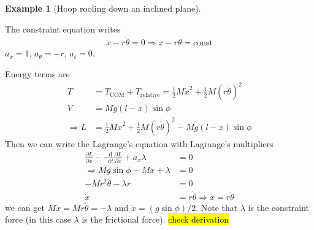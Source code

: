 \documentclass[twoside,11pt]{article}
\numberwithin{equation}{section} %
\newcommand{\lms}{\fontfamily{lmss}\selectfont} %
\renewcommand*\d{\mathop{}\!\mathrm{d}}
\theoremstyle{definition}
\newtheorem{example}{\lms Example}[section]
\theoremstyle{remark}
\begin{document}
\begin{example}[Hoop rooling down an inclined plane]\
\tikzexternalenable
\begin{figure}[H]
    \centering
\end{figure}
\tikzexternaldisable
The constraint equation writes
\begin{align*}
    \dot{x} - r\dot{\theta} = 0
    \Rightarrow x - r\theta = \text{const}
\end{align*}
$a_x=1$, $a_\theta = -r$, $a_t=0$.

Energy terms are
\begin{align*}
    T &= 
    T_\text{COM} + T_\text{relative}
    = \frac{1}{2}M\dot{x}^2 + \frac{1}{2}M(r\dot{\theta})^2\\
    V &= Mg(l-x)\sin\phi\\
    \Rightarrow
    L &=  \frac{1}{2}M\dot{x}^2 + \frac{1}{2}M(r\dot{\theta})^2
    - Mg(l-x)\sin\phi
\end{align*}
Then we can write the Lagrange's equation with Lagrange's multipliers
\begin{align*}
    \frac{\partial L}{\partial x} - \frac{\d }{\d t}\frac{\partial L}{\partial \dot{x}}
    + a_x\lambda &= 0\\
    \Rightarrow
    Mg\sin\phi - M\ddot{x} + \lambda &= 0\\
    -Mr^2\ddot{\theta} - \lambda r &= 0\\
    \dot{x} &= r\dot{\theta}\Rightarrow
    \ddot{x} = r\ddot{\theta}
\end{align*}
we can get $M\ddot{x} = Mr\ddot{\theta} = -\lambda$ and 
$\ddot{x} = (g\sin\phi)/2$.
Note that $\lambda$ is the constraint force (in this case $\lambda$
is the frictional force).
\hl{check derivation}
\end{example}
\end{document}

